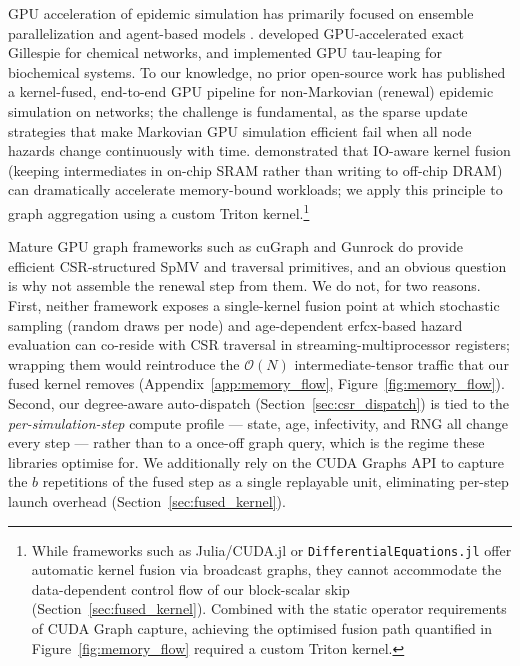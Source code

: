 \documentclass[a4paper,fleqn]{cas-sc}
\theoremstyle{definition}
\theoremstyle{remark}
\newcommand{\bigO}{\mathcal{O}}
\begin{document}
GPU acceleration of epidemic simulation has primarily focused on ensemble parallelization \citep{perumalla2006discrete, zou2013epidemic} and agent-based models \citep{bisset2009parallel}. \citet{komarov2012accelerating} developed GPU-accelerated exact Gillespie for chemical networks, and \citet{nobile2014cutauleaping} implemented GPU tau-leaping for biochemical systems. To our knowledge, no prior open-source work has published a kernel-fused, end-to-end GPU pipeline for non-Markovian (renewal) epidemic simulation on networks; the challenge is fundamental, as the sparse update strategies that make Markovian GPU simulation efficient fail when all node hazards change continuously with time. \citet{dao2022flashattention} demonstrated that IO-aware kernel fusion (keeping intermediates in on-chip SRAM rather than writing to off-chip DRAM) can dramatically accelerate memory-bound workloads; we apply this principle to graph aggregation using a custom Triton kernel.\footnote{While frameworks such as Julia/CUDA.jl or \texttt{DifferentialEquations.jl} offer automatic kernel fusion via broadcast graphs, they cannot accommodate the data-dependent control flow of our block-scalar skip (Section~\ref{sec:fused_kernel}). Combined with the static operator requirements of CUDA Graph capture, achieving the optimised fusion path quantified in Figure~\ref{fig:memory_flow} required a custom Triton kernel.}

Mature GPU graph frameworks such as cuGraph \citep{nvidia2019cugraph} and Gunrock \citep{wang2016gunrock} do provide efficient CSR-structured SpMV and traversal primitives, and an obvious question is why not assemble the renewal step from them. We do not, for two reasons. First, neither framework exposes a single-kernel fusion point at which stochastic sampling (random draws per node) and age-dependent $\mathrm{erfcx}$-based hazard evaluation can co-reside with CSR traversal in streaming-multiprocessor registers; wrapping them would reintroduce the $\bigO(N)$ intermediate-tensor traffic that our fused kernel removes (Appendix~\ref{app:memory_flow}, Figure~\ref{fig:memory_flow}). Second, our degree-aware auto-dispatch (Section~\ref{sec:csr_dispatch}) is tied to the \emph{per-simulation-step} compute profile --- state, age, infectivity, and RNG all change every step --- rather than to a once-off graph query, which is the regime these libraries optimise for. We additionally rely on the CUDA Graphs API \citep{nvidia2024cudagraphs} to capture the $b$ repetitions of the fused step as a single replayable unit, eliminating per-step launch overhead (Section~\ref{sec:fused_kernel}).
\end{document}
